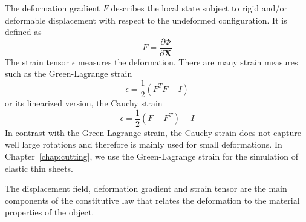 The deformation gradient $F$ describes the local state subject to rigid and/or deformable displacement with respect to the undeformed configuration. It is defined as
\begin{equation}
\label{eq:deformationGradient}
\displaystyle F = \frac{\partial \Phi}{\partial \mathbf{X}}
\end{equation}
The strain tensor $\epsilon$ measures the deformation.
There are many strain measures such as the Green-Lagrange strain
\begin{equation}
\label{eq:greenLagrangeStrain}
\displaystyle \epsilon = \frac{1}{2}\left(F^{T}F - I\right)
\end{equation}
or its linearized version, the Cauchy strain 
\begin{equation}
\label{eq:cauchyStrain}
\displaystyle \epsilon = \frac{1}{2}\left( F + F^{T} \right)-I
\end{equation}
In contrast with the Green-Lagrange strain, the Cauchy strain does not capture well large rotations and therefore is mainly used for small deformations. In Chapter~\ref{chap:cutting}, we use the Green-Lagrange strain for the simulation of elastic thin sheets.

The displacement field, deformation gradient and strain tensor are the main components of the constitutive law that relates the deformation to the material properties of the object.

